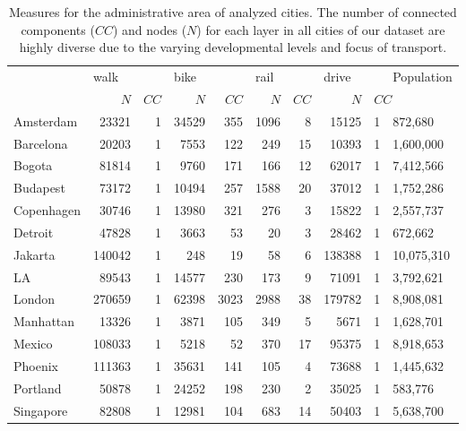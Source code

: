 \begin{table}[ht!]
	\centering
	\begin{adjustbox}{width=0.6\textwidth,keepaspectratio}
		\begin{tabular}{lrrrrrrrrl}
			\toprule
			{} & \multicolumn{2}{l}{walk} & \multicolumn{2}{l}{bike} & \multicolumn{2}{l}{rail} & \multicolumn{2}{l}{drive} &  Population \\
			{} &     $N$ & $CC$ &    $N$ &  $CC$ &   $N$ & $CC$ &     $N$ & \multicolumn{2}{l}{$CC$} \\
			\midrule
			Amsterdam  &   23321 &    1 &  34529 &   355 &  1096 &    8 &   15125 &    1 &     872,680 \\
			Barcelona  &   20203 &    1 &   7553 &   122 &   249 &   15 &   10393 &    1 &   1,600,000 \\
			Bogota     &   81814 &    1 &   9760 &   171 &   166 &   12 &   62017 &    1 &   7,412,566 \\
			Budapest   &   73172 &    1 &  10494 &   257 &  1588 &   20 &   37012 &    1 &   1,752,286 \\
			Copenhagen &   30746 &    1 &  13980 &   321 &   276 &    3 &   15822 &    1 &   2,557,737 \\
			Detroit    &   47828 &    1 &   3663 &    53 &    20 &    3 &   28462 &    1 &     672,662 \\
			Jakarta    &  140042 &    1 &    248 &    19 &    58 &    6 &  138388 &    1 &  10,075,310 \\
			LA         &   89543 &    1 &  14577 &   230 &   173 &    9 &   71091 &    1 &   3,792,621 \\
			London     &  270659 &    1 &  62398 &  3023 &  2988 &   38 &  179782 &    1 &   8,908,081 \\
			Manhattan  &   13326 &    1 &   3871 &   105 &   349 &    5 &    5671 &    1 &   1,628,701 \\
			Mexico     &  108033 &    1 &   5218 &    52 &   370 &   17 &   95375 &    1 &   8,918,653 \\
			Phoenix    &  111363 &    1 &  35631 &   141 &   105 &    4 &   73688 &    1 &   1,445,632 \\
			Portland   &   50878 &    1 &  24252 &   198 &   230 &    2 &   35025 &    1 &     583,776 \\
			Singapore  &   82808 &    1 &  12981 &   104 &   683 &   14 &   50403 &    1 &   5,638,700 \\
			\bottomrule
			\end{tabular}
	\end{adjustbox}
	\caption{Measures for the administrative area of analyzed cities. The number of connected components ($CC$) and nodes ($N$) for each layer in all cities of our dataset are highly diverse due to the varying developmental levels and focus of transport. 
		\label{tab:Table1}}
\end{table}

